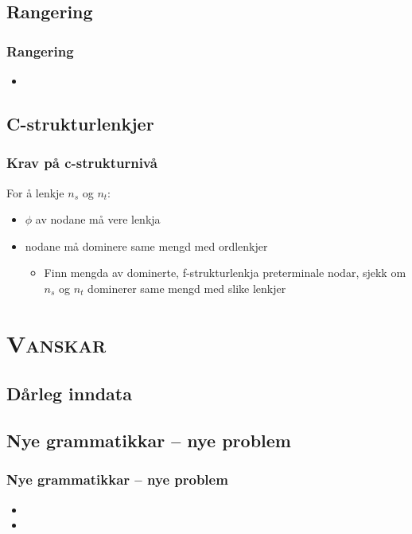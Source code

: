\documentclass[xcolor=x11names,compress,bigger]{beamer}
\renewcommand{\(}{\begin{columns}}
\renewcommand{\)}{\end{columns}}
\newcommand{\<}[1]{\begin{column}{#1}}
\renewcommand{\>}{\end{column}}
\begin{document}
\subsection{Rangering}
\begin{frame}\frametitle{Rangering}
  \begin{itemize}
  \item 
  \end{itemize}
\end{frame}

\subsection{C-strukturlenkjer}
\begin{frame}\frametitle{Krav på c-strukturnivå}
  For å lenkje $n_s$ og $n_t$:
  \begin{itemize}
  \item $\phi$ av nodane må vere lenkja
  \item nodane må dominere same mengd med ordlenkjer
    \begin{itemize}
    \item Finn mengda av dominerte, f-strukturlenkja preterminale
      nodar, sjekk om $n_s$ og $n_t$ dominerer same mengd med slike
      lenkjer
    \end{itemize}
  \end{itemize}
\end{frame}



\section{\scshape Vanskar}
\subsection{Dårleg inndata}
\subsection{Nye grammatikkar -- nye problem}
\begin{frame}\frametitle{Nye grammatikkar -- nye problem}
  \begin{itemize}
  \item 
  \item 
  \end{itemize}
\end{frame}
\end{document}
